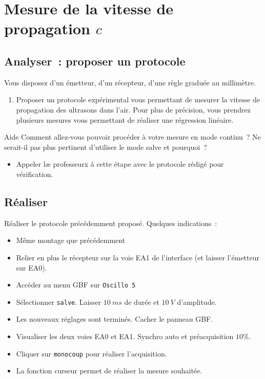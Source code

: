 \documentclass[a4paper, 11pt, final, garamond]{book}
\begin{document}
\section{Mesure de la vitesse de propagation $c$}

\subsection{Analyser~: proposer un protocole}

Vous disposez d'un émetteur, d'un récepteur, d'une règle graduée au millimètre.
\bigbreak

\begin{enumerate}[label=\clenumi, resume]
    \item Proposer un protocole expérimental vous permettant de mesurer la
        vitesse de propagation des ultrasons dans l'air. Pour plus de précision,
        vous prendrez plusieurs mesures vous permettant de réaliser une
        régression linéaire. 
\end{enumerate}

\begin{instruc}{Aide}
    Comment allez-vous pouvoir procéder à votre mesure en mode continu~? Ne
    serait-il pas plus pertinent d'utiliser le mode salve et pourquoi~? 
\end{instruc}

\bigskip

\begin{itemize}
    \item Appeler læ professeurx à cette étape avec le protocole rédigé pour
        vérification. 
\end{itemize}

\subsection{Réaliser}

Réaliser le protocole précédemment proposé. Quelques indications~: 

\begin{itemize}
    \item Même montage que précédemment
    \item Relier en plus le récepteur sur la voie EA1 de l'interface (et laisser
        l'émetteur sur EA0).
    \item Accéder au menu GBF sur \texttt{Oscillo 5}
    \item Sélectionner \texttt{salve}. Laisser $\SI{10}{ms}$ de durée et
        $\SI{10}{V}$ d'amplitude. 
    \item Les nouveaux réglages sont terminés. Cacher le panneau GBF.
    \item Visualiser les deux voies EA0 et EA1. Synchro auto et préacquisition
        $10 \%$.
    \item Cliquer sur \texttt{monocoup} pour réaliser l'acquisition.
    \item La fonction curseur permet de réaliser la mesure souhaitée. 
\end{itemize}
\end{document}
